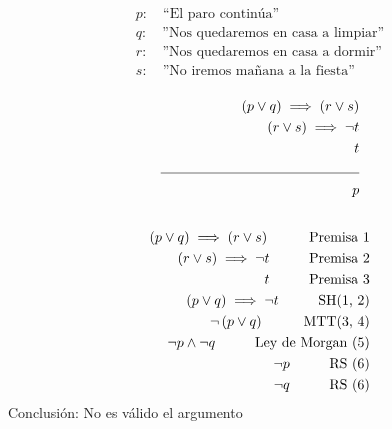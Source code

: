 \documentclass{article}
\begin{document}
\begin{equation*}
	\begin{split}
		p: \quad\text{“El paro continúa”} \\
		q: \quad\text{”Nos quedaremos en casa a limpiar”} \\
		r: \quad\text{”Nos quedaremos en casa a dormir”} \\
		s: \quad\text{”No iremos mañana a la fiesta”} \\\\
	\end{split}
\end{equation*}
\begin{equation*}
	\begin{split}
		\left( p \lor q \right) \implies \left( r \lor s \right) \\
		\left( r \lor s \right) \implies \neg t \\
		t \\
		\noindent\rule{5cm}{0.4pt} \\
		p \\\\
	\end{split}
\end{equation*}
\begin{align}
	\left( p \lor q \right) \implies \left( r \lor s \right) \quad\text{ \indent  Premisa 1} \\
	\left( r \lor s \right) \implies \neg t \quad\text{  \indent Premisa 2}                  \\
	t \quad\text{ \indent Premisa 3}                                                         \\
	\left(p \lor q \right) \implies \neg t \quad\text{  \indent SH(1, 2)}                    \\
	\neg \left( p \lor q \right) \quad\text{ \indent MTT(3, 4)}                              \\
	\neg p \land \neg q \quad\text{ \indent Ley de Morgan (5)}                               \\
	\neg p \quad\text{ \indent RS (6)}                                                       \\
	\neg q \quad\text{ \indent RS (6)}
\end{align}
Conclusión: No es válido el argumento
\end{document}
